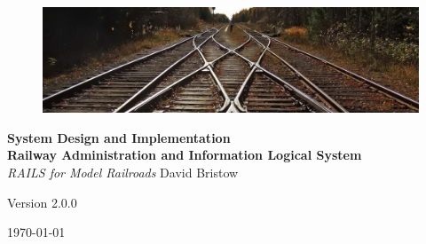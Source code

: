 \documentclass[letterpaper, oneside, 11pt]{book}
\begin{document}
\begin{titlepage}
	\raggedleft
	\begin{figure}[H]
	\centering
		\includegraphics[scale=1.53]{railway_track.jpg}
	\label{fig:track}
\end{figure}
	\vspace*{0.167\textheight}
	\textbf{\LARGE System Design and Implementation}\\[\baselineskip]
    \textbf{\textcolor{MyBlue}{\Huge R\Large ailway \Huge A\Large dministration and \Huge I\Large nformation \Huge L\Large ogical \Huge S\Large ystem}}\\[\baselineskip]
	{\Large \textit{RAILS for Model Railroads}}
	\vfill
    \vspace*{\baselineskip}
	{\small David Bristow}

	{\small Version 2.0.0}
	
	{\small \today}
	\vspace*{3\baselineskip}
\end{titlepage}
\tableofcontents






\backmatter

\printnoidxglossary[sort=letter]
\end{document}
